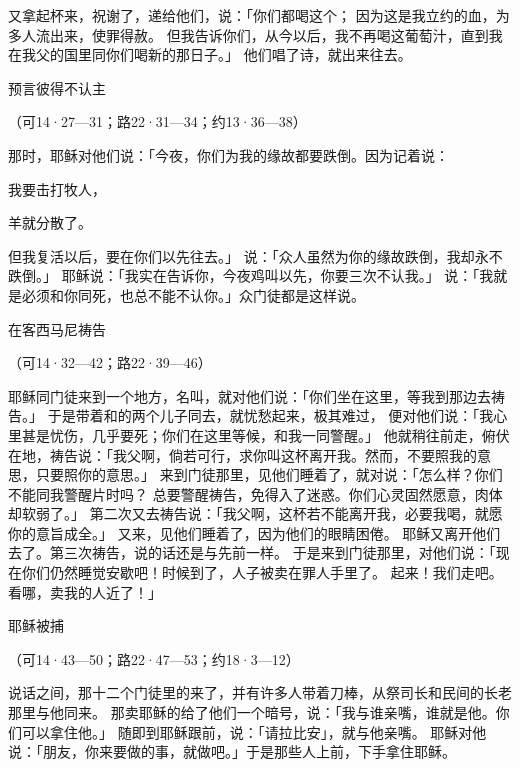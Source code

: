 {又拿起杯来，祝谢了，递给他们，说：「你们都喝这个；
因为这是我立约的血，为多人流出来，使罪得赦。
但我告诉你们，从今以后，我不再喝这葡萄汁，直到我在我父的国里同你们喝新的那日子。」
他们唱了诗，就出来往{}去。
\par }{\SH 预言彼得不认主
\par }{\R （可14·27—31；路22·31—34；约13·36—38）
\par }{\PP {}那时，耶稣对他们说：「今夜，你们为我的缘故都要跌倒。因为{}记着说：
\par }{\Q 我要击打牧人，
\par }{\Q 羊就分散了。
\par }{\MM {}但我复活以后，要在你们以先往{}去。」
说：「众人虽然为你的缘故跌倒，我却永不跌倒。」
耶稣说：「我实在告诉你，今夜鸡叫以先，你要三次不认我。」
说：「我就是必须和你同死，也总不能不认你。」众门徒都是这样说。
\par }{\SH 在客西马尼祷告
\par }{\R （可14·32—42；路22·39—46）
\par }{\PP {}耶稣同门徒来到一个地方，名叫{}，就对他们说：「你们坐在这里，等我到那边去祷告。」
于是带着{}和{}的两个儿子同去，就忧愁起来，极其难过，
便对他们说：「我心里甚是忧伤，几乎要死；你们在这里等候，和我一同警醒。」
他就稍往前走，俯伏在地，祷告说：「我父啊，倘若可行，求你叫这杯离开我。然而，不要照我的意思，只要照你的意思。」
来到门徒那里，见他们睡着了，就对{}说：「怎么样？你们不能同我警醒片时吗？
总要警醒祷告，免得入了迷惑。你们心灵固然愿意，肉体却软弱了。」
第二次又去祷告说：「我父啊，这杯若不能离开我，必要我喝，就愿你的意旨成全。」
又来，见他们睡着了，因为他们的眼睛困倦。
耶稣又离开他们去了。第三次祷告，说的话还是与先前一样。
于是来到门徒那里，对他们说：「现在你们仍然睡觉安歇吧！时候到了，人子被卖在罪人手里了。
起来！我们走吧。看哪，卖我的人近了！」
\par }{\SH 耶稣被捕
\par }{\R （可14·43—50；路22·47—53；约18·3—12）
\par }{\PP {}说话之间，那十二个门徒里的{}来了，并有许多人带着刀棒，从祭司长和民间的长老那里与他同来。
那卖耶稣的给了他们一个暗号，说：「我与谁亲嘴，谁就是他。你们可以拿住他。」
随即到耶稣跟前，说：「请拉比安」，就与他亲嘴。
耶稣对他说：「朋友，你来要做的事，就做吧。」于是那些人上前，下手拿住耶稣。
}
